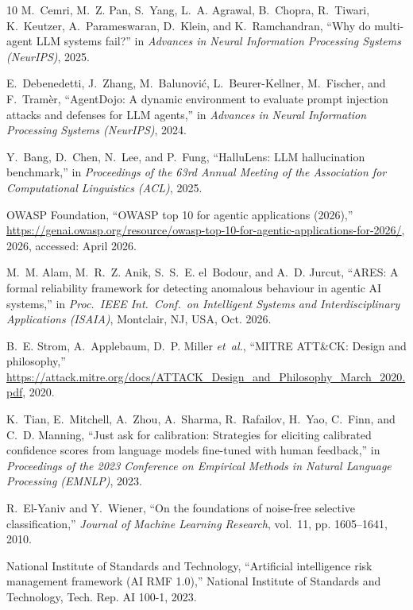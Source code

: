 \documentclass[journal,compsoc]{IEEEtran}
\begin{document}
\begin{thebibliography}{10}
M.~Cemri, M.~Z. Pan, S.~Yang, L.~A. Agrawal, B.~Chopra, R.~Tiwari, K.~Keutzer,
  A.~Parameswaran, D.~Klein, and K.~Ramchandran, ``Why do multi-agent {LLM}
  systems fail?'' in \emph{Advances in Neural Information Processing Systems
  ({NeurIPS})}, 2025.

E.~Debenedetti, J.~Zhang, M.~Balunovi{\'c}, L.~Beurer-Kellner, M.~Fischer, and
  F.~Tram{\`e}r, ``{AgentDojo}: A dynamic environment to evaluate prompt
  injection attacks and defenses for {LLM} agents,'' in \emph{Advances in
  Neural Information Processing Systems ({NeurIPS})}, 2024.

Y.~Bang, D.~Chen, N.~Lee, and P.~Fung, ``{HalluLens}: {LLM} hallucination
  benchmark,'' in \emph{Proceedings of the 63rd Annual Meeting of the
  Association for Computational Linguistics ({ACL})}, 2025.

{OWASP Foundation}, ``{OWASP} top 10 for agentic applications (2026),''
  \url{https://genai.owasp.org/resource/owasp-top-10-for-agentic-applications-for-2026/},
  2026, accessed: April 2026.

M.~M. Alam, M.~R.~Z. Anik, S.~S.~E. el~Bodour, and A.~D. Jurcut, ``{ARES}: A
  formal reliability framework for detecting anomalous behaviour in agentic
  {AI} systems,'' in \emph{Proc.\ IEEE Int.\ Conf.\ on Intelligent Systems and
  Interdisciplinary Applications (ISAIA)}, Montclair, NJ, USA, Oct. 2026.

B.~E. Strom, A.~Applebaum, D.~P. Miller \emph{et~al.}, ``{MITRE ATT\&CK}:
  Design and philosophy,''
  \url{https://attack.mitre.org/docs/ATTACK_Design_and_Philosophy_March_2020.pdf},
  2020.

K.~Tian, E.~Mitchell, A.~Zhou, A.~Sharma, R.~Rafailov, H.~Yao, C.~Finn, and
  C.~D. Manning, ``Just ask for calibration: Strategies for eliciting
  calibrated confidence scores from language models fine-tuned with human
  feedback,'' in \emph{Proceedings of the 2023 Conference on Empirical Methods
  in Natural Language Processing ({EMNLP})}, 2023.

R.~El-Yaniv and Y.~Wiener, ``On the foundations of noise-free selective
  classification,'' \emph{Journal of Machine Learning Research}, vol.~11, pp.
  1605--1641, 2010.

{National Institute of Standards and Technology}, ``Artificial intelligence
  risk management framework ({AI RMF} 1.0),'' National Institute of Standards
  and Technology, Tech. Rep. AI 100-1, 2023.

\end{thebibliography}
\end{document}
